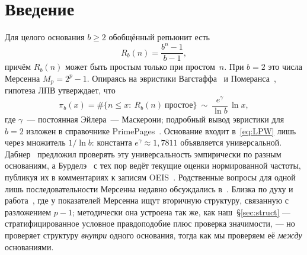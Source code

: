 \documentclass[11pt,a4paper]{article}
\theoremstyle{plain}
\theoremstyle{remark}
\newcommand{\Rb}{R_b}
\newcommand{\eg}{e^{\gamma}}
\begin{document}
\begin{otherlanguage}{english}
\begin{abstract}
\medskip
\noindent\textbf{Keywords:} repunit primes, generalized repunits, Mersenne
primes, Lenstra--Pomerance--Wagstaff conjecture, Euler--Mascheroni constant,
observation scheme, Type-I censoring, Poisson point process,
conditional likelihood, nuisance parameters, Neyman--Scott problem, sufficient
statistic, estimator bias, statistical power, computational number theory

\medskip
\noindent\textbf{Acknowledgments:} the author thanks the Great Internet Mersenne
Prime Search (GIMPS) project for providing the Mersenne prime data through the
open PrimeNet report (\url{https://www.mersenne.org/}); the Mersenne exponents
were retrieved on 27 August 2026. The author is grateful to the OEIS contributors
who have maintained the generalized repunit prime sequences for many years, and
Jaume Gotanegra (MathOverflow, \url{https://mathoverflow.net/questions/514719})
for pointing out that
the conditional likelihood~\eqref{eq:condlaw} is also obtained by integrating
out the frontier against $dW_b$ (Remark~\ref{rem:integrated}).

\medskip
\noindent\textbf{Funding:} this research received no external funding.
\end{abstract}
\end{otherlanguage}

\section{Введение}

Для целого основания $b\ge2$ обобщённый репьюнит есть
\begin{equation}\label{eq:Rb}
\Rb(n)=\frac{b^{n}-1}{b-1},
\end{equation}
причём $\Rb(n)$ может быть простым только при простом~$n$. При $b=2$ это числа Мерсенна
$M_p=2^{p}-1$. Опираясь на эвристики Вагстаффа~\cite{wagstaff1983} и
Померанса~\cite{pomerance1981}, гипотеза ЛПВ утверждает, что
\begin{equation}\label{eq:LPW}
\pi_b(x)=\#\{n\le x:\ \Rb(n)\ \text{простое}\}\ \sim\ \frac{\eg}{\ln b}\,\ln x,
\end{equation}
где $\gamma$~--- постоянная Эйлера~--- Маскерони; подробный вывод эвристики для
$b=2$ изложен в справочнике PrimePages~\cite{t5k}. Основание входит
в~\eqref{eq:LPW} лишь через множитель $1/\ln b$: константа $\eg\approx1{,}7811$
объявляется универсальной.
Дабнер~\cite{dubner1993} предложил проверять эту универсальность эмпирически по разным
основаниям, а Бурделэ~\cite{bourdelais2009} с тех пор ведёт текущие оценки нормированной
частоты, публикуя их в комментариях к записям OEIS~\cite{oeis}. Родственные вопросы для
одной лишь последовательности Мерсенна недавно обсуждались в~\cite{wagstaff2025}.
Близка по духу и работа~\cite{dominguez2026}, где у показателей Мерсенна ищут
вторичную структуру, связанную с разложением $p-1$; методически она устроена так же,
как наш~\S\ref{sec:struct} --- стратифицированное условное правдоподобие плюс
проверка значимости, --- но проверяет структуру \emph{внутри} одного основания,
тогда как мы проверяем её \emph{между} основаниями.
\end{document}
